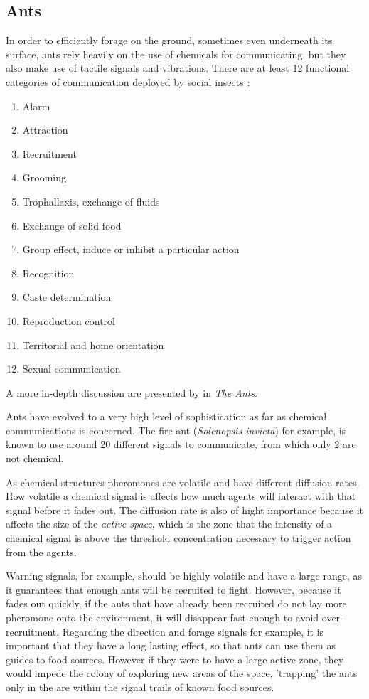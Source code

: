 \subsection{Ants}


In order to efficiently forage on the ground, sometimes even underneath its surface, ants rely heavily on the use of chemicals for communicating, but they also make use of tactile signals and vibrations. \cite{holldobler1999} There are at least 12 functional categories of communication deployed by social insects \cite{citeulike:3731267}:

\begin{enumerate}
  \item Alarm
  \item Attraction
  \item Recruitment
  \item Grooming
  \item Trophallaxis, exchange of fluids
  \item Exchange of solid food
  \item Group effect, induce or inhibit a particular action
  \item Recognition
  \item Caste determination
  \item Reproduction control
  \item Territorial and home orientation
  \item Sexual communication
\end{enumerate}

A more in-depth discussion are presented by \citeauthor{holldobler1990} in \emph{The Ants}.

Ants have evolved to a very high level of sophistication as far as chemical communications is concerned. The fire ant (\emph{Solenopsis invicta}) for example, is known to use around 20 different signals to communicate, from which only 2 are not chemical. \cite{citeulike:3731267} \cite{tschinkel2006fire}

As chemical structures pheromones are volatile and have different diffusion rates. How volatile a chemical signal is affects how much agents will interact with that signal before it fades out. The diffusion rate is also of hight importance because it affects the size of the \emph{active space}, which is the zone that the intensity of a chemical signal is above the threshold concentration necessary to trigger action from the agents. \cite{citeulike:3731267} 

Warning signals, for example, should be highly volatile and have a large range, as it guarantees that enough ants will be recruited to fight. However, because it fades out quickly, if the ants that have already been recruited do not lay more pheromone onto the environment, it will disappear fast enough to avoid over-recruitment. Regarding the direction and forage signals for example, it is important that they have a long lasting effect, so that ants can use them as guides to food sources. However if they were to have a large active zone, they would impede the colony of exploring new areas of the space, 'trapping' the ants only in the are within the signal trails of known food sources.

